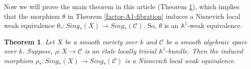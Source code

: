 \documentclass[11pt, reqno]{amsart}
\theoremstyle{plain}
\newtheorem{theorem}[thm]{Theorem}
\theoremstyle{definition}
\newcommand{\Spec}{{\rm Spec \,}}
\newcommand{\A}{{\mathbb A}}
\begin{document}
	
Now we will prove the main theorem in this article (Theorem \ref{sing-etale-bundle}), which implies that the morphism $\theta$ in Theorem \ref{factor-A1-fibration} induces
a Nisnevich local weak equivalence $\theta_*: Sing_*(X) \to Sing_*(\mathcal{C})$. So, $\theta$ is an $\A^1$-weak equivalence.
\begin{theorem} \label{sing-etale-bundle}
		Let $X$ be a smooth variety over $k$ and $\mathcal{C}$ be a smooth algebraic space over $k$. Suppose, $\rho: X \to \mathcal{C}$ is an \'etale locally trivial $\mathbb{A}^1$-bundle.
		Then the induced morphism $\rho_*: Sing_*(X) \to Sing_*(\mathcal{C})$ is a Nisnevich local weak equivalence.
	\end{theorem}
\end{document}
